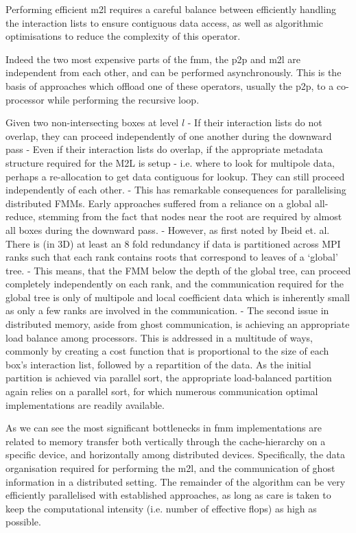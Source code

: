 Performing efficient \acrshort{m2l} requires a careful balance between efficiently handling the interaction lists to ensure contiguous data access, as well as algorithmic optimisations to reduce the complexity of this operator.

Indeed the two most expensive parts of the \acrshort{fmm}, the \acrshort{p2p} and \acrshort{m2l} are independent from each other, and can be performed asynchronously. This is the basis of approaches which offload one of these operators, usually the \acrshort{p2p}, to a co-processor while performing the recursive loop.

Given two non-intersecting boxes at level $l$
- If their interaction lists do not overlap, they can proceed independently of one another during the downward pass
- Even if their interaction lists do overlap, if the appropriate metadata structure required for the M2L is setup - i.e. where to look for multipole data, perhaps a re-allocation to get data contiguous for lookup. They can still proceed independently of each other.
- This has remarkable consequences for parallelising distributed FMMs. Early approaches suffered from a reliance on a global all-reduce, stemming from the fact that nodes near the root are required by almost all boxes during the downward pass.
- However, as first noted by Ibeid et. al. There is (in 3D) at least an 8 fold redundancy if data is partitioned across MPI ranks such that each rank contains roots that correspond to leaves of a `global' tree.
- This means, that the FMM below the depth of the global tree, can proceed completely independently on each rank, and the communication required for the global tree is only of multipole and local coefficient data which is inherently small as only a few ranks are involved in the communication.
- The second issue in distributed memory, aside from ghost communication, is achieving an appropriate load balance among processors. This is addressed in a multitude of ways, commonly by creating a cost function that is proportional to the size of each box's interaction list, followed by a repartition of the data. As the initial partition is achieved via parallel sort, the appropriate load-balanced partition again relies on a parallel sort, for which numerous communication optimal implementations are readily available.

As we can see the most significant bottlenecks in \acrshort{fmm} implementations are related to memory transfer both vertically through the cache-hierarchy on a specific device, and horizontally among distributed devices. Specifically, the data organisation required for performing the \acrshort{m2l}, and the communication of ghost information in a distributed setting. The remainder of the algorithm can be very efficiently parallelised with established approaches, as long as care is taken to keep the computational intensity (i.e. number of effective flops) as high as possible.

